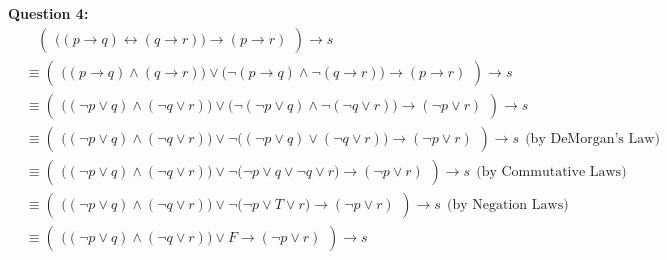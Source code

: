 \documentclass[a4paper,12pt]{article}
\begin{document}
\begin{spacing}{1.4}
    \newpage
    \textbf{Question 4:}
    \begin{align*}
        &\ \ \ \ \left( \begin{array}{c}
        \big( (p\rightarrow q) \leftrightarrow (q\rightarrow r)\big)
        \rightarrow (p \rightarrow r)
        \end{array} \right) \rightarrow s\\
        &\equiv \left( \begin{array}{c}
        \big( (p\rightarrow q) \wedge (q\rightarrow r)\big) 
        \vee 
        \big( \neg (p\rightarrow q) \wedge \neg (q\rightarrow r) \big)
        \rightarrow (p \rightarrow r)
        \end{array} \right) \rightarrow s\\
        &\equiv \left( \begin{array}{c}
        \big( (\neg p \vee q) \wedge (\neg q\vee r)\big) 
        \vee 
        \big( \neg (\neg p\vee q) \wedge \neg (\neg q\vee r) \big)
        \rightarrow (\neg p \vee r)
        \end{array} \right) \rightarrow s\\
        &\equiv \left( \begin{array}{c}
        \big( (\neg p \vee q) \wedge (\neg q\vee r)\big) 
        \vee 
        \neg \big( (\neg p\vee q) \vee  (\neg q\vee r) \big)
        \rightarrow (\neg p \vee r)
        \end{array} \right) \rightarrow s
        \ \ \text{(by DeMorgan's Law)}\\
        &\equiv \left( \begin{array}{c}
        \big( (\neg p \vee q) \wedge (\neg q\vee r)\big) 
        \vee 
        \neg \big( \neg p\vee q \vee  \neg q\vee r \big)
        \rightarrow (\neg p \vee r)
        \end{array} \right) \rightarrow s
        \ \ \text{(by Commutative Laws)}\\
        &\equiv \left( \begin{array}{c}
        \big( (\neg p \vee q) \wedge (\neg q\vee r)\big) 
        \vee 
        \neg \big( \neg p\vee T \vee r \big)
        \rightarrow (\neg p \vee r)
        \end{array} \right) \rightarrow s
        \ \ \text{(by Negation Laws)}\\
        &\equiv \left( \begin{array}{c}
        \big( (\neg p \vee q) \wedge (\neg q\vee r)\big) 
        \vee F
        \rightarrow (\neg p \vee r)
        \end{array} \right) \rightarrow s

\end{align*}
\end{spacing}
\end{document}

